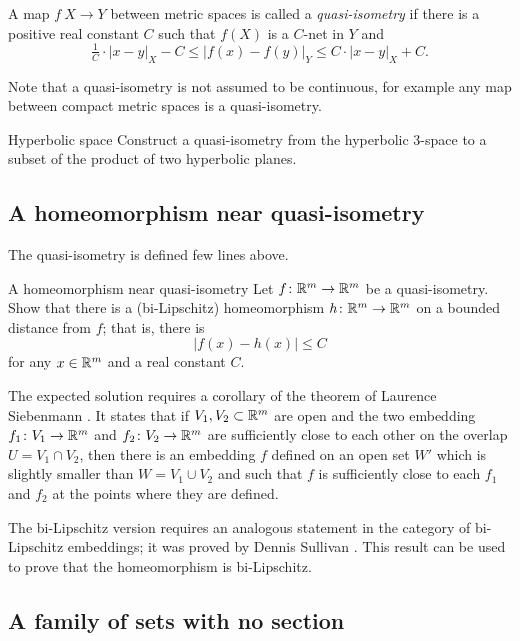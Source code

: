 A map $f\:X\to Y$ between metric spaces is called a \emph{quasi-isometry} if there is a positive real constant $C$ such that $f(X)$ is a $C$-net in $Y$ and
$$\tfrac{1}{C}\cdot|x-y|_X-C
\le 
|f(x)-f(y)|_Y\le C\cdot|x-y|_X+C.$$

Note that a quasi-isometry is not assumed to be continuous, for example any map between compact metric spaces is a quasi-isometry.

\begin{pr}{}{Hyperbolic space}\label{Hyperbolic space}
Construct a quasi-isometry
from the hyperbolic $3$-space 
to a subset 
of the product of two hyperbolic planes.
\end{pr}

\subsection*{A homeomorphism near quasi-isometry\thm}

The quasi-isometry is defined few lines above.

\begin{pr}{\thm}{A homeomorphism near quasi-isometry}\label{hom-near-QI} 
Let $f\colon\mathbb{R}^m\to\mathbb{R}^m$ be a quasi-isometry.
Show that there is a (bi-Lipschitz) homeomorphism 
$h\colon\mathbb{R}^m\to\mathbb{R}^m$ on a bounded distance from $f$;
that is, there is 
$$|f(x)-h(x)|\le C$$
for any $x\in\mathbb{R}^m$ and a real constant $C$.
\end{pr}

The expected solution requires a corollary of the theorem  of Laurence Siebenmann \cite{siebenmann}.
It states that 
if $V_1, V_2\subset\mathbb{R}^m$ are open
and the two embedding $f_1\colon V_1\to\mathbb{R}^m$ and $f_2\colon V_2\to\mathbb{R}^m$ 
are sufficiently close to each other 
on the overlap $U=V_1\cap V_2$, 
then
there is an embedding $f$ defined on an open set $W'$
which is slightly smaller than $W=V_1\cup V_2$
and such that $f$ is sufficiently close to each $f_1$ and $f_2$ at the points where they are defined.

The  bi-Lipschitz version requires 
an analogous statement in the category of bi-Lipschitz embeddings;
it was proved by
Dennis Sullivan \cite[see][]{sullivan}.
This result can be used to prove that the homeomorphism is bi-Lipschitz.

\subsection*{A family of sets with no section}

